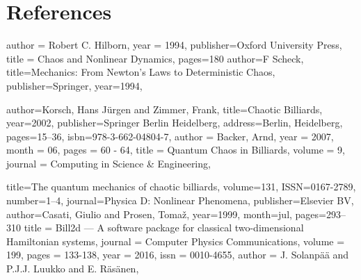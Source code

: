 \documentclass[12pt,a4paper]{amsart}
\begin{document}
\section*{References} 
\begin{biblist}
    
        {
        author = {Robert C. Hilborn},
        year = {1994},
        publisher={Oxford University Press},
        title = {Chaos and Nonlinear Dynamics},
        pages={180}
        }
        {
        author={F Scheck},
        title={Mechanics: From Newton's Laws to Deterministic Chaos},
        publisher={Springer},
        year={1994}, 
        }

        {
        author={Korsch, Hans J{\"u}rgen
        and Zimmer, Frank},
        title={Chaotic Billiards},
        year={2002},
        publisher={Springer Berlin Heidelberg},
        address={Berlin, Heidelberg},
        pages={15--36},
        isbn={978-3-662-04804-7},
        }
        {
        author = {Backer, Arnd},
        year = {2007},
        month = {06},
        pages = {60 - 64},
        title = {Quantum Chaos in Billiards},
        volume = {9},
        journal = {Computing in Science \& Engineering},
        }

    {
        title={The quantum mechanics of chaotic billiards},
       volume={131},
       ISSN={0167-2789},
       number={1–4},
       journal={Physica D: Nonlinear Phenomena},
       publisher={Elsevier BV},
       author={Casati, Giulio and Prosen, Tomaž},
       year={1999},
       month=jul, pages={293–310} 
   }
    {
        title = {Bill2d — A software package for classical two-dimensional Hamiltonian systems},
        journal = {Computer Physics Communications},
        volume = {199},
        pages = {133-138},
        year = {2016},
        issn = {0010-4655},
        author = {J. Solanpää and P.J.J. Luukko and E. Räsänen},
    }


   

\end{biblist}
\end{document}
